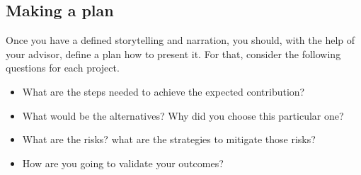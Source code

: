 \subsection{Making a plan}

Once you have a defined storytelling and narration,  you should, with the help of your advisor, define a plan how to present it. For that, consider the following questions for each project. 

\begin{itemize}
    \item  What are the steps needed to achieve the expected contribution?
    \item  What would be the alternatives? Why did you choose this particular one?
    \item  What are the risks? what are the strategies to mitigate those risks?
    \item  How are you going to validate your outcomes?
\end{itemize}




% 
% 
% 
% 
% 

